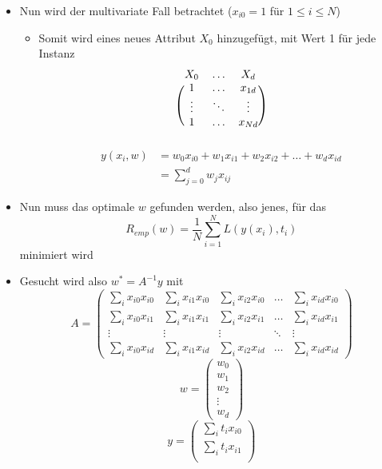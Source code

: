 \documentclass{scrartcl}
\begin{document}
\begin{itemize}
	\item Nun wird der multivariate Fall betrachtet ($ x_{i0} = 1 $ für $ 1 
	\leq i \leq N $)
	\begin{itemize}
		\item Somit wird eines neues Attribut $ X_0 $ hinzugefügt, mit Wert 1 
		für jede Instanz
		\[
			\begin{blockarray}{ccc}
				X_0 & \ldots & X_d \\
				\begin{block}{(ccc)}
					1 & \ldots & x_{1d} \\
					\vdots & \ddots & \vdots \\
					1 & \ldots & x_{Nd} \\
				\end{block}
			\end{blockarray}
		\]
		\begin{align*}
			y(x_i, w) &= w_0x_{i0} + w_1x_{i1} + w_2x_{i2} + \ldots + w_dx_{id} 
			\\
			&= \sum_{j=0}^{d} w_jx_{ij}
		\end{align*}
	\end{itemize}
	\item Nun muss das optimale $ w $ gefunden werden, also jenes, für das
	\[ R_{emp}(w) = \frac{1}{N} \sum_{i=1}^{N} L(y(x_i), t_i) \]
	minimiert wird
	\item Gesucht wird also $ w^* = A^{-1} y $ mit
	\[ A = \begin{pmatrix}
		\sum_{i} x_{i0}x_{i0} & \sum_{i} x_{i1}x_{i0} & \sum_{i} 
		x_{i2}x_{i0} & \ldots & \sum_{i} x_{id}x_{i0} \\
		\sum_{i} x_{i0}x_{i1} & \sum_{i} x_{i1}x_{i1} & \sum_{i} 
		x_{i2}x_{i1} & \ldots & \sum_{i} x_{id}x_{i1} \\
		\vdots & \vdots & \vdots & \ddots & \vdots \\
		\sum_{i} x_{i0}x_{id} & \sum_{i} x_{i1}x_{id} & \sum_{i} 
		x_{i2}x_{id} & \ldots & \sum_{i} x_{id}x_{id}
	\end{pmatrix} \]
	\[ w = \begin{pmatrix}
		w_0 \\
		w_1 \\
		w_2 \\
		\vdots \\
		w_d
	\end{pmatrix} \]
	\[ y = \begin{pmatrix}
		\sum_i t_i x_{i0} \\
		\sum_i t_i x_{i1} \\

\end{pmatrix}\]
\end{itemize}
\end{document}
